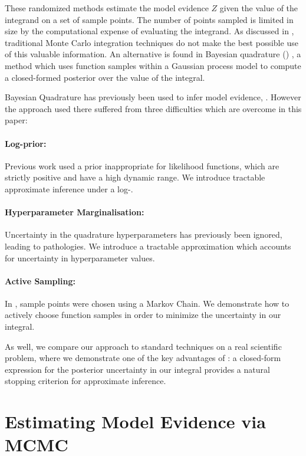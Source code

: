 \documentclass{article}
\begin{document}
These randomized methods estimate the model evidence $Z$ given the value of the integrand on a set of sample points.  The number of points sampled is limited in size by the computational expense of evaluating the integrand. As discussed in \citep{MCUnsound}, traditional Monte Carlo integration techniques do not make the best possible use of this valuable information. An alternative is found in Bayesian quadrature () \citep{BZHermiteQuadrature}, a method which uses function samples within a Gaussian process model to compute a closed-formed posterior over the value of the integral.

Bayesian Quadrature has previously been used to infer model evidence, \citep{BZMonteCarlo}.  However the approach used there suffered from three difficulties which are overcome in this paper: 

\paragraph*{Log-prior:} Previous work used a \gpb prior inappropriate for likelihood functions, which are strictly positive and have a high dynamic range.  We introduce tractable approximate inference under a log-\gp.

\paragraph*{Hyperparameter Marginalisation:} Uncertainty in the quadrature hyperparameters has previously been ignored, leading to pathologies.  We introduce a tractable approximation which accounts for uncertainty in hyperparameter values.  

\paragraph*{Active Sampling:} In \citep{BZMonteCarlo}, sample points were chosen using a Markov Chain.  We demonstrate how to actively choose function samples in order to minimize the uncertainty in our integral.

As well, we compare our  approach to standard  techniques on a real scientific problem, where we demonstrate one of the key advantages of : a closed-form expression for the posterior uncertainty in our integral provides a natural stopping criterion for approximate inference.

\section{Estimating Model Evidence via MCMC}
\end{document}
